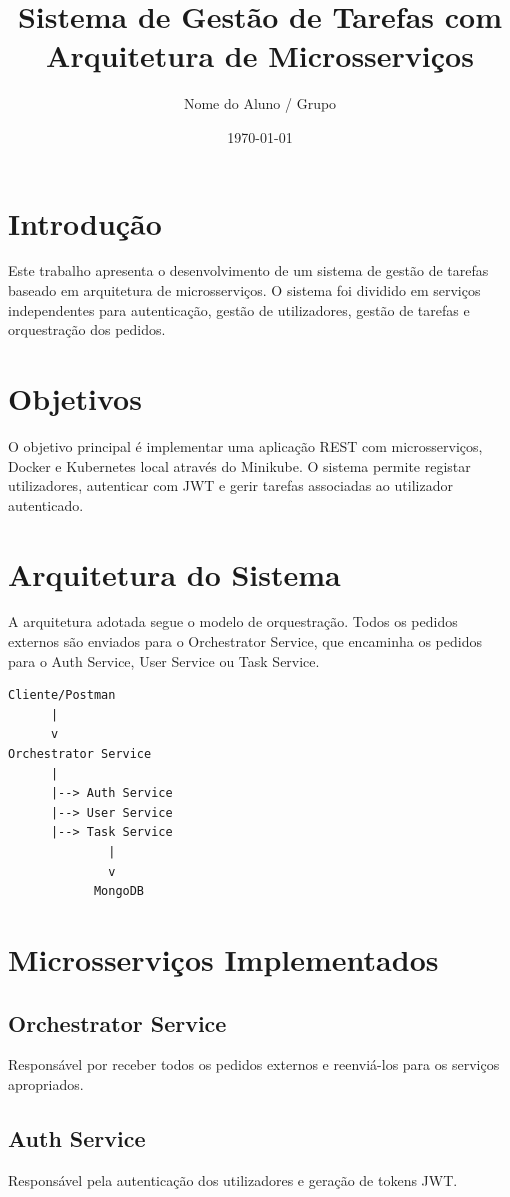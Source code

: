 \documentclass[12pt,a4paper]{article}
\title{Sistema de Gestão de Tarefas com Arquitetura de Microsserviços}
\author{Nome do Aluno / Grupo}
\date{\today}
\begin{document}
\maketitle

\section{Introdução}
Este trabalho apresenta o desenvolvimento de um sistema de gestão de tarefas baseado em arquitetura de microsserviços. O sistema foi dividido em serviços independentes para autenticação, gestão de utilizadores, gestão de tarefas e orquestração dos pedidos.

\section{Objetivos}
O objetivo principal é implementar uma aplicação REST com microsserviços, Docker e Kubernetes local através do Minikube. O sistema permite registar utilizadores, autenticar com JWT e gerir tarefas associadas ao utilizador autenticado.

\section{Arquitetura do Sistema}
A arquitetura adotada segue o modelo de orquestração. Todos os pedidos externos são enviados para o Orchestrator Service, que encaminha os pedidos para o Auth Service, User Service ou Task Service.

\begin{verbatim}
Cliente/Postman
      |
      v
Orchestrator Service
      |
      |--> Auth Service
      |--> User Service
      |--> Task Service
              |
              v
            MongoDB
\end{verbatim}

\section{Microsserviços Implementados}
\subsection{Orchestrator Service}
Responsável por receber todos os pedidos externos e reenviá-los para os serviços apropriados.

\subsection{Auth Service}
Responsável pela autenticação dos utilizadores e geração de tokens JWT.
\end{document}
